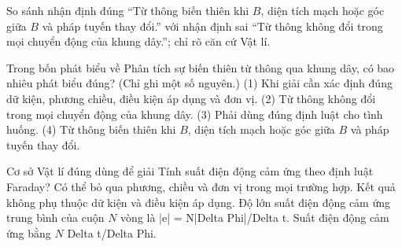 \begin{bt}
So sánh nhận định đúng “Từ thông biến thiên khi $B$, diện tích mạch hoặc góc giữa $B$ và pháp tuyến thay đổi.” với nhận định sai “Từ thông không đổi trong mọi chuyển động của khung dây.”; chỉ rõ căn cứ Vật lí.
\end{bt}

\begin{ex}
Trong bốn phát biểu về Phân tích sự biến thiên từ thông qua khung dây, có bao nhiêu phát biểu đúng? (Chỉ ghi một số nguyên.) (1) Khi giải cần xác định đúng dữ kiện, phương chiều, điều kiện áp dụng và đơn vị. (2) Từ thông không đổi trong mọi chuyển động của khung dây. (3) Phải dùng đúng định luật cho tình huống. (4) Từ thông biến thiên khi $B$, diện tích mạch hoặc góc giữa $B$ và pháp tuyến thay đổi.
\end{ex}

\begin{ex}
Cơ sở Vật lí đúng dùng để giải Tính suất điện động cảm ứng theo định luật Faraday?
\choice
{Có thể bỏ qua phương, chiều và đơn vị trong mọi trường hợp.}
{Kết quả không phụ thuộc dữ kiện và điều kiện áp dụng.}
{\True Độ lớn suất điện động cảm ứng trung bình của cuộn $N$ vòng là |e| = N|Delta Phi|/Delta t.}
{Suất điện động cảm ứng bằng $N$ Delta t/Delta Phi.}
\end{ex}

